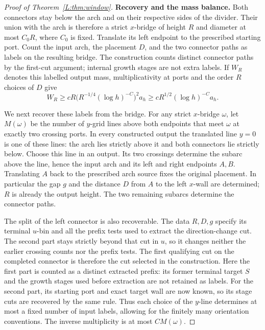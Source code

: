 \begin{proof}[Proof of Theorem~\ref{L:thm:window}]
\medskip\noindent\textbf{Recovery and the mass balance.}
Both connectors stay below the arch and on their respective sides of
the divider. Their union with the arch is therefore a strict $x$-bridge
of height $R$ and diameter at most $C_0R$, where $C_0$ is fixed.
Translate its left endpoint to the prescribed starting port. Count the input arch, the placement $D$,
and the two connector paths as labels on the resulting bridge. The
construction counts distinct connector paths by the first-cut argument;
internal growth stages are not extra labels.
If $W_R$ denotes this labelled output mass, multiplicativity at ports
and the order $R$ choices of $D$ give
\begin{equation}
 W_R\ge cR\bigl(R^{-1/4}(\log h)^{-C}\bigr)^2a_h
       \ge cR^{1/2}(\log h)^{-C}a_h.
 \label{L:eq:connector-labelled-mass}
\end{equation}

We next recover these labels from the bridge. For any strict $x$-bridge
$\omega$, let $M(\omega)$ be the number of $y$-grid lines above both
endpoints that meet $\omega$ at exactly two crossing ports. In every
constructed output the translated line $y=0$ is one of these lines:
the arch lies strictly above it and both connectors lie strictly below.
Choose this line in an output. Its two crossings determine the subarc
above the line, hence the input arch and its left and right endpoints
$A,B$. Translating $A$ back to the prescribed arch source fixes the
original placement. In particular the gap $g$ and the distance $D$
from $A$ to the left $x$-wall are determined; $R$ is already the output
height. The two remaining subarcs determine the connector paths.

The split of the left connector is also recoverable. The data $R,D,g$
specify its terminal $u$-bin and all the prefix tests used to extract
the direction-change cut. The second part stays strictly beyond that
cut in $u$, so it changes neither the earlier crossing counts nor the
prefix tests. The first qualifying cut on the completed connector is
therefore the cut selected in the construction. Here the first part
is counted as a distinct extracted prefix: its former terminal target
$S$ and the growth stages used before extraction are not retained as
labels. For the second part, its starting port and exact target wall
are now known, so its stage cuts are recovered by the same rule.
Thus each choice of the $y$-line determines at most a fixed number of
input labels, allowing for the finitely many orientation conventions.
The inverse multiplicity is at most $C M(\omega)$.


\end{proof}
